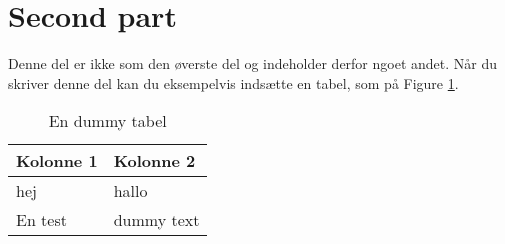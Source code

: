 \documentclass[Main]{subfiles}
\begin{document}
\section{Second part}

Denne del er ikke som den øverste del og indeholder derfor ngoet andet.
Når du skriver denne del kan du eksempelvis indsætte en tabel, som på Figure \ref{tab:dummy}.

\begin{table}[hb]
	\centering
	\begin{tabular}{ l l}
	\textbf{Kolonne 1}	& \textbf{Kolonne 2} \\ \hline
	 hej & hallo \\ 
	En test & dummy text \\ \hline
	\end{tabular}

	\caption{En dummy tabel}
	\label{tab:dummy}
\end{table}
\end{document}
